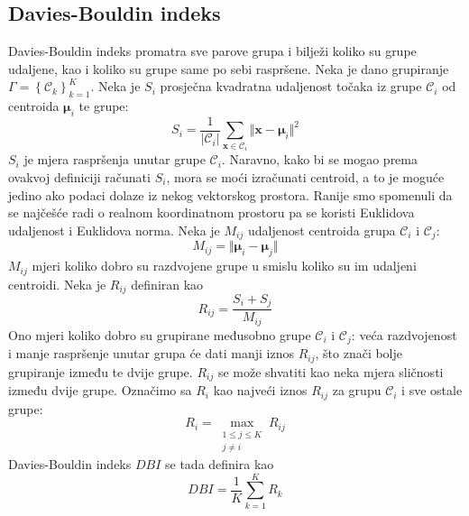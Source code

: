 \documentclass[times, utf8, zavrsni]{fer}
\begin{document}
\subsection{Davies-Bouldin indeks}
Davies-Bouldin indeks promatra sve parove grupa i bilježi koliko su grupe udaljene, kao i koliko su grupe same po sebi raspršene. Neka je dano grupiranje $\Gamma = \left\{\mathcal{C}_k\right\}_{k=1}^{K}$. Neka je $S_i$ prosječna kvadratna udaljenost točaka iz grupe $\mathcal{C}_i$ od centroida $\boldsymbol{\mu}_i$ te grupe:
\[S_i = \frac{1}{\left\vert \mathcal{C}_i \right\vert}
\sum_{\mathbf{x} \in \mathcal{C}_i} \Vert \mathbf{x} - \boldsymbol{\mu}_i  \Vert^2
\]
$S_i$ je mjera raspršenja unutar grupe $\mathcal{C}_i$. Naravno, kako bi se mogao prema ovakvoj definiciji računati $S_i$, mora se moći izračunati centroid, a to je moguće jedino ako podaci dolaze iz nekog vektorskog prostora. Ranije smo spomenuli da se najčešće radi o realnom koordinatnom prostoru pa se koristi Euklidova udaljenost i Euklidova norma. Neka je $M_{ij}$ udaljenost centroida grupa $\mathcal{C}_i$ i $\mathcal{C}_j$:
\[M_{ij} = \Vert \boldsymbol{\mu}_i - \boldsymbol{\mu}_j \Vert\]
$M_{ij}$ mjeri koliko dobro su razdvojene grupe u smislu koliko su im udaljeni centroidi. Neka je $R_{ij}$ definiran kao
\[R_{ij} = \frac{S_i + S_j}{M_{ij}}\]
Ono mjeri koliko dobro su grupirane međusobno grupe $\mathcal{C}_i$ i $\mathcal{C}_j$: veća razdvojenost i manje raspršenje unutar grupa će dati manji iznos $R_{ij}$, što znači bolje grupiranje između te dvije grupe. $R_{ij}$ se može shvatiti kao neka mjera sličnosti između dvije grupe. Označimo sa $R_i$ kao najveći iznos $R_{ij}$ za grupu $\mathcal{C}_i$ i sve ostale grupe:
\[R_i = \max_{\substack{1 \leq j \leq K \\ j \neq i}} R_{ij}\]
Davies-Bouldin indeks $DBI$ se tada definira kao
\[DBI = \frac{1}{K} \sum_{k=1}^{K} R_k\]
\end{document}

